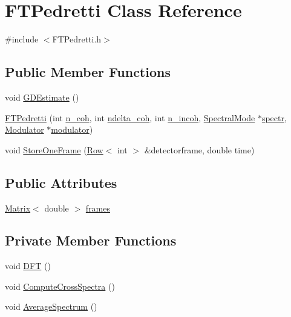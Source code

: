 \hypertarget{classFTPedretti}{
\section{FTPedretti Class Reference}
\label{classFTPedretti}
}


{\ttfamily \#include $<$FTPedretti.h$>$}

\subsection*{Public Member Functions}
\begin{DoxyCompactItemize}
\item 
void \hyperlink{classFTPedretti_aa5840df9985ff246fc42318c94c7779a}{GDEstimate} ()
\item 
\hyperlink{classFTPedretti_a8aa7bb8087a0e003f495e0ca98393867}{FTPedretti} (int \hyperlink{classFTPedretti_ad60e472d0ef298c0ccd9255662d2e92e}{n\_\-coh}, int \hyperlink{classFTPedretti_a62797d32a2a9efb508a6a50e37537bca}{ndelta\_\-coh}, int \hyperlink{classFTPedretti_a80d65a4169e0885939736694bc76f4a8}{n\_\-incoh}, \hyperlink{classSpectralMode}{SpectralMode} $\ast$\hyperlink{classFTPedretti_a154536c2195506b9c254e417cf752cb6}{spectr}, \hyperlink{classModulator}{Modulator} $\ast$\hyperlink{classFTPedretti_ac366c4d6cd99a518c673d3636ab97245}{modulator})
\item 
void \hyperlink{classFTPedretti_a8d57325be576602b6f3eb56c2b4ef19d}{StoreOneFrame} (\hyperlink{classRow}{Row}$<$ int $>$ \&detectorframe, double time)
\end{DoxyCompactItemize}
\subsection*{Public Attributes}
\begin{DoxyCompactItemize}
\item 
\hyperlink{classMatrix}{Matrix}$<$ double $>$ \hyperlink{classFTPedretti_ae3c6c05c945c59fb8b3df83876faeab2}{frames}
\end{DoxyCompactItemize}
\subsection*{Private Member Functions}
\begin{DoxyCompactItemize}
\item 
void \hyperlink{classFTPedretti_abbda83f3da7fc03afc92af8a9197b71e}{DFT} ()
\item 
void \hyperlink{classFTPedretti_a12bed5efb6c39dd3bf07e696c04a215b}{ComputeCrossSpectra} ()
\item 
void \hyperlink{classFTPedretti_ac229ccfe757c2b890fe465ef7367aebe}{AverageSpectrum} ()
\end{DoxyCompactItemize}

